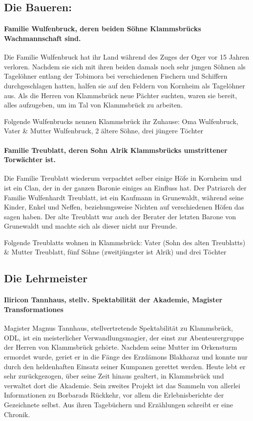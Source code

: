 \subsection{Die Baueren:}
\paragraph{Familie Wulfenbruck, deren beiden Söhne Klammsbrücks Wachmannschaft sind.}
Die Familie Wulfenbruck hat ihr Land während des Zuges der Oger vor 15 Jahren verloren. Nachdem sie sich mit ihren beiden damals noch sehr jungen Söhnen als Tagelöhner entlang der Tobimora bei verschiedenen Fischern und Schiffern durchgeschlagen hatten, halfen sie auf den Feldern von Kornheim als Tagelöhner aus. Als die Herren von Klammsbrück neue Pächter suchten, waren sie bereit, alles aufzugeben, um im Tal von Klammsbrück zu arbeiten.

Folgende Wulfenbrucks nennen Klammsbrück ihr Zuhause: Oma Wulfenbruck, Vater \& Mutter Wulfenbruck, 2 ältere Söhne, drei jüngere Töchter

\paragraph{Familie Treublatt, deren Sohn Alrik Klammsbrücks umstrittener Torwächter ist.}
Die Familie Treublatt wiederum verpachtet selber einige Höfe in Kornheim und ist ein Clan, der in der ganzen Baronie einiges an Einfluss hat. Der Patriarch der Familie Wulfenhardt Treublatt, ist ein Kaufmann in Grunewaldt, während seine Kinder, Enkel und Neffen, beziehungsweise Nichten auf verschiedenen Höfen das sagen haben. Der alte Treublatt war auch der Berater der letzten Barone von Grunewaldt und machte sich als dieser nicht nur Freunde.

Folgende Treublatts wohnen in Klammsbrück: Vater (Sohn des alten Treublatts) \& Mutter Treublatt, fünf Söhne (zweitjüngster ist Alrik) und drei Töchter

\subsection{Die Lehrmeister}
\paragraph{Iliricon Tannhaus, stellv. Spektabilität der Akademie, Magister Transformationes}
Magister Magnus Tannhaus, stellvertretende Spektabilität zu Klammsbrück, ODL, ist ein meisterlicher Verwandlungsmagier, der einst zur Abenteurergruppe der Herren von Klammsbrück gehörte. Nachdem seine Mutter im Orkensturm ermordet wurde, geriet er in die Fänge des Erzdämons Blakharaz und konnte nur durch den heldenhaften Einsatz seiner Kumpanen gerettet werden. Heute lebt er sehr zurückgezogen, über seine Zeit hinaus gealtert, in Klammsbrück und verwaltet dort die Akademie. Sein zweites Projekt ist das Sammeln von allerlei Informationen zu Borbarads Rückkehr, vor allem die Erlebnisberichte der Gezeichnete selbst. Aus ihren Tagebüchern und Erzählungen schreibt er eine Chronik.

